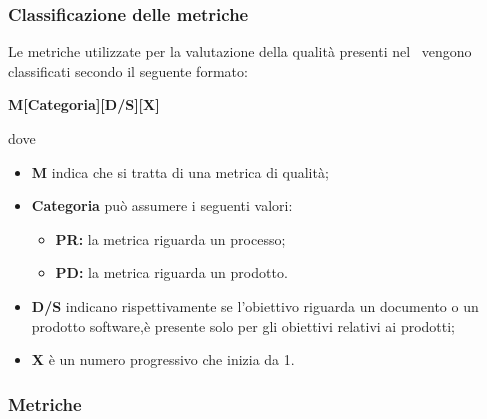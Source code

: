 \subsubsection{Classificazione delle metriche}\label{ClassificazioneMetriche}
Le metriche utilizzate per la valutazione della qualità presenti nel \PdQv{}\ vengono classificati secondo il seguente formato:
\begin{center}
	\textbf{M[Categoria][D/S][X]}
\end{center}
dove 
\begin{itemize}
	\item \textbf{M} indica che si tratta di una metrica di qualità;
	\item \textbf{Categoria} può assumere i seguenti valori:
	\begin{itemize}
		\item \textbf{PR:} la metrica riguarda un processo;
		\item \textbf{PD:} la metrica riguarda un prodotto.
	\end{itemize}
	\item \textbf{D/S} indicano rispettivamente se l'obiettivo riguarda un documento o un prodotto software,è presente solo per gli obiettivi relativi ai prodotti;
	\item \textbf{X} è un numero progressivo che inizia da 1.
\end{itemize}
\subsubsection{Metriche}